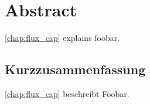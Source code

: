
\disableornamentsfornextheadingtrue
\section*{Abstract}
\cref{chap:flux_cap} explains foobar.

\blindtext

\begin{otherlanguage}{ngerman}
  \disableornamentsfornextheadingtrue
  \section*{Kurzzusammenfassung}
  \cref{chap:flux_cap} beschreibt Foobar.
  
  \blindtext
\end{otherlanguage}

\cleardoublepage
